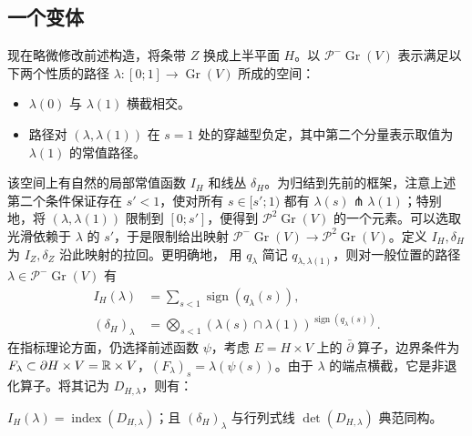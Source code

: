 \subsection{一个变体}\label{sec:11g}
现在略微修改前述构造，将条带 $Z$ 换成上半平面 $H$。以 $\mathcal P^-\operatorname{Gr}(V)$ 表示满足以下两个性质的路径 $\lambda:[0;1]\to\operatorname{Gr}(V)$ 所成的空间：
\begin{itemize}
\item $\lambda(0)$ 与 $\lambda(1)$ 横截相交。
\item 路径对 $(\lambda,\allowbreak \lambda(1))$ 在 $s=1$ 处的穿越型负定，其中第二个分量表示取值为 $\lambda(1)$ 的常值路径。
\end{itemize}
该空间上有自然的局部常值函数 $I_H$ 和线丛 $\delta_H$。为归结到先前的框架，注意上述第二个条件保证存在 $s'<1$，使对所有 $s\in[s';1)$ 都有 $\lambda(s)\pitchfork\lambda(1)$；特别地，将 $(\lambda,\allowbreak \lambda(1))$ 限制到 $[0;s']$，便得到 $\mathcal P^2\operatorname{Gr}(V)$ 的一个元素。可以选取光滑依赖于 $\lambda$ 的 $s'$，于是限制给出映射 $\mathcal P^-\operatorname{Gr}(V)\to\mathcal P^2\operatorname{Gr}(V)$。定义 $I_H,\allowbreak \delta_H$ 为 $I_Z,\allowbreak \delta_Z$ 沿此映射的拉回。更明确地，
用 $q_\lambda$ 简记 $q_{\lambda,\allowbreak \lambda(1)}$，则对一般位置的路径 $\lambda\in\mathcal P^-\operatorname{Gr}(V)$ 有
\begin{equation}\label{eq:11.20}
\begin{aligned}
I_H(\lambda)&=\sum_{s<1}\operatorname{sign}(q_\lambda(s)),\\
(\delta_H)_\lambda&=\bigotimes_{s<1}(\lambda(s)\cap\lambda(1))^{\operatorname{sign}(q_\lambda(s))}.
\end{aligned}
\end{equation}
在指标理论方面，仍选择前述函数 $\psi$，考虑 $E=H\times V$ 上的 $\bar\partial$ 算子，边界条件为 $F_\lambda\subset\partial H\times V=\mathbb R\times V$，$(F_\lambda)_s=\lambda(\psi(s))$。由于 $\lambda$ 的端点横截，它是非退化算子。将其记为 $D_{H,\allowbreak \lambda}$，则有：
\begin{lemma}\label{st:11.11}
$I_H(\lambda)=\operatorname{index}(D_{H,\allowbreak \lambda})$；且 $(\delta_H)_\lambda$ 与行列式线 $\det(D_{H,\allowbreak \lambda})$ 典范同构。
\end{lemma}
